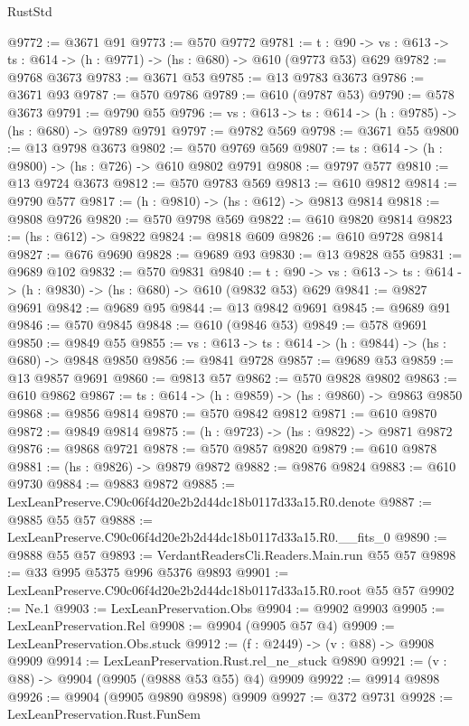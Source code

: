 \begin{lexlean}{RustStd}
\begin{coremodule}
@9772 := @3671 @91
@9773 := @570 @9772
@9781 := {t : @90} ->
  {vs : @613} -> {ts : @614} -> (h : @9771) -> (hs : @680) -> @610 (@9773 @53) @629
@9782 := @9768 @3673
@9783 := @3671 @53
@9785 := @13 @9783 @3673
@9786 := @3671 @93
@9787 := @570 @9786
@9789 := @610 (@9787 @53)
@9790 := @578 @3673
@9791 := @9790 @55
@9796 := {vs : @613} -> {ts : @614} -> (h : @9785) -> (hs : @680) -> @9789 @9791
@9797 := @9782 @569
@9798 := @3671 @55
@9800 := @13 @9798 @3673
@9802 := @570 @9769 @569
@9807 := {ts : @614} -> (h : @9800) -> (hs : @726) -> @610 @9802 @9791
@9808 := @9797 @577
@9810 := @13 @9724 @3673
@9812 := @570 @9783 @569
@9813 := @610 @9812
@9814 := @9790 @577
@9817 := (h : @9810) -> (hs : @612) -> @9813 @9814
@9818 := @9808 @9726
@9820 := @570 @9798 @569
@9822 := @610 @9820 @9814
@9823 := (hs : @612) -> @9822
@9824 := @9818 @609
@9826 := @610 @9728 @9814
@9827 := @676 @9690
@9828 := @9689 @93
@9830 := @13 @9828 @55
@9831 := @9689 @102
@9832 := @570 @9831
@9840 := {t : @90} ->
  {vs : @613} -> {ts : @614} -> (h : @9830) -> (hs : @680) -> @610 (@9832 @53) @629
@9841 := @9827 @9691
@9842 := @9689 @95
@9844 := @13 @9842 @9691
@9845 := @9689 @91
@9846 := @570 @9845
@9848 := @610 (@9846 @53)
@9849 := @578 @9691
@9850 := @9849 @55
@9855 := {vs : @613} -> {ts : @614} -> (h : @9844) -> (hs : @680) -> @9848 @9850
@9856 := @9841 @9728
@9857 := @9689 @53
@9859 := @13 @9857 @9691
@9860 := @9813 @57
@9862 := @570 @9828 @9802
@9863 := @610 @9862
@9867 := {ts : @614} -> (h : @9859) -> (hs : @9860) -> @9863 @9850
@9868 := @9856 @9814
@9870 := @570 @9842 @9812
@9871 := @610 @9870
@9872 := @9849 @9814
@9875 := (h : @9723) -> (hs : @9822) -> @9871 @9872
@9876 := @9868 @9721
@9878 := @570 @9857 @9820
@9879 := @610 @9878
@9881 := (hs : @9826) -> @9879 @9872
@9882 := @9876 @9824
@9883 := @610 @9730
@9884 := @9883 @9872
@9885 := LexLeanPreserve.C90c06f4d20e2b2d44dc18b0117d33a15.R0.denote
@9887 := @9885 @55 @57
@9888 := LexLeanPreserve.C90c06f4d20e2b2d44dc18b0117d33a15.R0.__fits_0
@9890 := @9888 @55 @57
@9893 := VerdantReadersCli.Readers.Main.run @55 @57
@9898 := @33 @995 @5375 @996 @5376 @9893
@9901 := LexLeanPreserve.C90c06f4d20e2b2d44dc18b0117d33a15.R0.root @55 @57
@9902 := Ne.{1}
@9903 := LexLeanPreservation.Obs
@9904 := @9902 @9903
@9905 := LexLeanPreservation.Rel
@9908 := @9904 (@9905 @57 @4)
@9909 := LexLeanPreservation.Obs.stuck
@9912 := (f : @2449) -> (v : @88) -> @9908 @9909
@9914 := LexLeanPreservation.Rust.rel_ne_stuck @9890
@9921 := (v : @88) -> @9904 (@9905 (@9888 @53 @55) @4) @9909
@9922 := @9914 @9898
@9926 := @9904 (@9905 @9890 @9898) @9909
@9927 := @372 @9731
@9928 := LexLeanPreservation.Rust.FunSem

\end{coremodule}
\end{lexlean}
